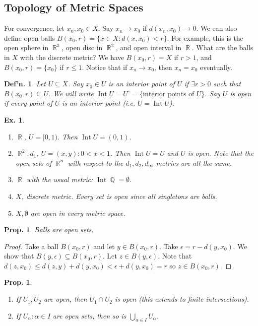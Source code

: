 \documentclass[12pt, a4paper]{book}
\DeclareMathOperator{\Q}{\mathbb{Q}}
\DeclareMathOperator{\R}{\mathbb{R}}
\DeclareMathOperator{\Int}{Int}
\newtheorem{definition}[theorem]{Def'n.}
\newtheorem{proposition}[theorem]{Prop.}
\newtheorem{example}[theorem]{Ex.}
\theoremstyle{nonumberplain}
\newtheorem{proof}{Proof}
\begin{document}
\subsection{Topology of Metric Spaces}
For convergence, let $x_n,x_0\in X$. Say $x_n\to x_0$ if $d(x_n,x_0)\to 0$.
We can also define open balls $B(x_0,r)=\{x\in X:d(x,x_0)<r\}$. For example, this is the open
sphere in $\R^3$, open disc in $\R^2$, and open interval in $\R$. What are the balls in $X$ with the discrete metric?
We have $B(x_0,r)=X$ if $r>1$, and $B(x_0,r)=\{x_0\}$ if $r\leq 1$. Notice that if $x_n\to x_0$, then $x_n=x_0$ eventually.
\begin{definition}
    Let $U\subseteq X$. Say $x_0\in U$ is an interior point of $U$ if $\exists r>0$ such that $B(x_0,r)\subseteq U$.
    We will write $\Int U=U^\circ=\{\text{interior points of $U$}\}$. Say $U$ is open if every point of $U$ is an
    interior point (i.e. $U=\Int U$).
\end{definition}
\begin{example}\hspace{1cm}
    \begin{enumerate}
        \item $\R$, $U=[0,1)$. Then $\Int U=(0,1)$.
        \item $\R^2,d_1$, $U=(x,y):0<x<1$. Then $\Int U=U$ and $U$ is open. Note that the open sets of $\R^n$ with respect
            to the $d_1,d_2,d_\infty$ metrics are all the same.
        \item $\R$ with the usual metric: $\Int\Q=\emptyset$.
        \item $X$, discrete metric. Every set is open since all singletons are balls.
        \item $X,\emptyset$ are open in every metric space.
    \end{enumerate}
\end{example}
\begin{proposition}
    Balls are open sets.
\end{proposition}
\begin{proof}
    Take a ball $B(x_0,r)$ and let $y\in B(x_0,r)$. Take $\epsilon=r-d(y,x_0)$. We show that $B(y,\epsilon)\subseteq B(x_0,r)$.
    Let $z\in B(y,\epsilon)$. Note that $d(z,x_0)\leq d(z,y)+d(y,x_0)<\epsilon+d(y,x_0)=r$ so $z\in B(x_0,r)$.
\end{proof}
\begin{proposition}
    \begin{enumerate}
        \item If $U_1,U_2$ are open, then $U_1\cap U_2$ is open (this extends to finite intersections).
        \item If $U_\alpha:\alpha\in I$ are open sets, then so is $\bigcup_{\alpha\in I}U_\alpha$.
    \end{enumerate}
\end{proposition}
\end{document}
